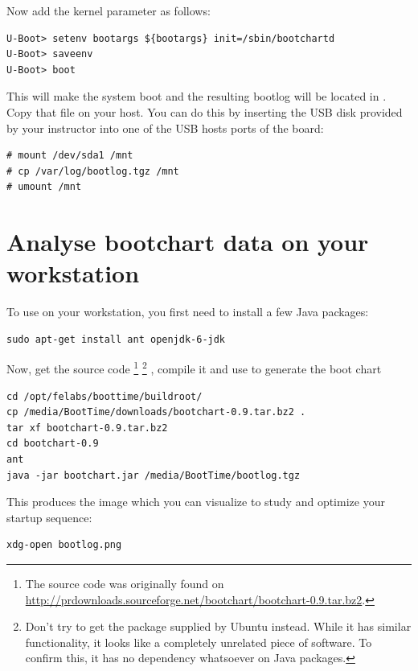 Now add the  kernel parameter as follows:

\begin{verbatim}
U-Boot> setenv bootargs ${bootargs} init=/sbin/bootchartd
U-Boot> saveenv
U-Boot> boot
\end{verbatim}

This will make the system boot and the resulting bootlog will be located
in . Copy that file on your host. You can do
this by inserting the USB disk provided by your instructor into one of
the USB hosts ports of the board:

\begin{verbatim}
# mount /dev/sda1 /mnt
# cp /var/log/bootlog.tgz /mnt
# umount /mnt
\end{verbatim}

\section{Analyse bootchart data on your workstation}

To use  on your workstation, you first need to
install a few Java packages:

\begin{verbatim}
sudo apt-get install ant openjdk-6-jdk
\end{verbatim}

Now, get the  source code 
\footnote{The source code was originally found on
\url{http://prdownloads.sourceforge.net/bootchart/bootchart-0.9.tar.bz2}.}
\footnote{Don't try to get the  package supplied by
Ubuntu instead. While it has similar functionality, it looks like a completely
unrelated piece of software. To confirm this, it has no dependency
whatsoever on Java packages.}
, compile it and use  to generate the boot
chart

\begin{verbatim}
cd /opt/felabs/boottime/buildroot/
cp /media/BootTime/downloads/bootchart-0.9.tar.bz2 .
tar xf bootchart-0.9.tar.bz2
cd bootchart-0.9
ant
java -jar bootchart.jar /media/BootTime/bootlog.tgz
\end{verbatim}

This produces the  image which you can visualize to
study and optimize your startup sequence:

\begin{verbatim}
xdg-open bootlog.png
\end{verbatim}

